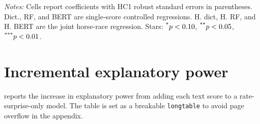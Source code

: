 \begin{table}[H]
\centering
\caption{RQ1 coefficients: ECB press conferences}
\label{tab:a2_rq1_ecb_pc}
\begingroup
\scriptsize
\setlength{\tabcolsep}{1.7pt}
\renewcommand{\arraystretch}{0.90}
\par\smallskip
\begin{minipage}{0.92\textwidth}
\scriptsize
\emph{Notes:} Cells report coefficients with HC1 robust standard errors in parentheses. Dict., RF, and BERT are single-score controlled regressions. H. dict, H. RF, and H. BERT are the joint horse-race regression. Stars: $^{\text{*}}p<0.10$, $^{\text{**}}p<0.05$, $^{\text{***}}p<0.01$.
\end{minipage}
\endgroup
\end{table}



\section{Incremental explanatory power}
\label{app:a2_incremental_r2}

 reports the increase in explanatory power from
adding each text score to a rate-surprise-only model. The table is set as a
breakable \texttt{longtable} to avoid page overflow in the appendix.

